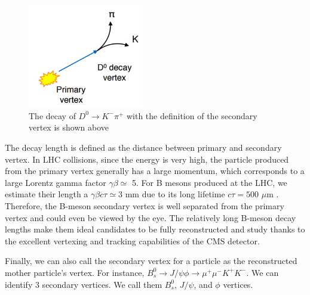 \begin{figure}[hbtp]
\begin{center}
\includegraphics[width=0.45\textwidth]{Figures/Chapter4/D0Seconary.png}
\caption{The decay of $D^0 \rightarrow K^- \pi^+$ with the definition of the secondary vertex is shown above}
\label{D0Vtx}
\end{center}
\end{figure} 

The decay length is defined as the distance between primary and secondary vertex. In LHC collisions, since the energy is very high, the particle produced from the primary vertex generally has a large momentum, which corresponds to a large Lorentz gamma factor $\gamma \beta \simeq$ 5. For B mesons produced at the LHC, we estimate their length a $\gamma \beta c \tau \simeq 3$ mm due to its long lifetime $c \tau = 500$ $\mu$m \cite{AlphaTheoEx}. Therefore, the B-meson secondary vertex is well separated from the primary vertex and could even be viewed by the eye. The relatively long B-meson decay lengths make them ideal candidates to be fully reconstructed and study thanks to the excellent vertexing and tracking capabilities of the CMS detector.

Finally, we can also call the secondary vertex for a particle as the reconstructed mother particle's vertex. For instance, $B^0_s \rightarrow J/\psi \phi \rightarrow \mu^+\mu^- K^+K^-$. We can identify 3 secondary vertices. We call them $B^0_s$, $J/\psi$, and $\phi$ vertices. 

